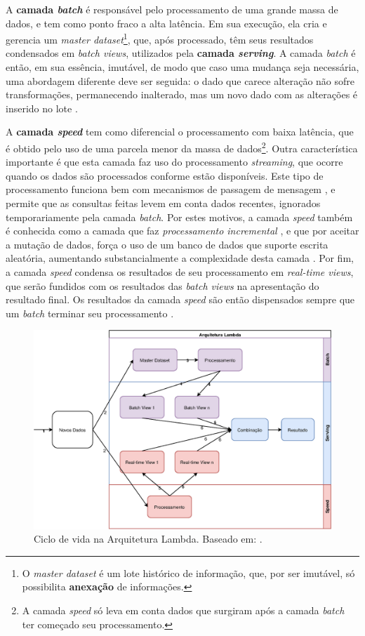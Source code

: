 A \textbf{camada \textit{batch}} é responsável pelo processamento de uma grande
massa de dados, e tem como ponto fraco a alta latência. Em sua execução, ela
cria e gerencia um \textit{master dataset}\footnote{O \textit{master dataset} é um lote
histórico de informação, que, por ser imutável, só possibilita \textbf{anexação}
de informações.}, que, após processado, têm seus resultados condensados em
\textit{batch views}, utilizados pela \textbf{camada \textit{serving}}.
A camada \textit{batch} é então, em sua essência, imutável, de modo que caso
uma mudança seja necessária, uma abordagem diferente deve ser seguida: o dado
que carece alteração não sofre transformações, permanecendo inalterado, mas um
novo dado com as alterações é inserido no lote \cite{marz2015}.

A \textbf{camada \textit{speed}} tem como diferencial o processamento com baixa
latência, que é obtido pelo uso de uma parcela menor da massa de dados\footnote{
A camada \textit{speed} só leva em conta dados que surgiram após a camada
\textit{batch} ter começado seu processamento.}. Outra característica importante
é que esta camada faz uso do processamento \textit{streaming}, que ocorre
quando os dados são processados conforme estão disponíveis. Este tipo de
processamento funciona bem com mecanismos de passagem de mensagem
\cite{marz2015}, e permite que as consultas feitas levem em conta dados
recentes, ignorados temporariamente pela camada \textit{batch}. Por estes
motivos, a camada \textit{speed} também é conhecida como a camada que faz
\textit{processamento incremental} \cite{marz2015}, e que por aceitar a mutação
de dados, força o uso de um banco de dados que suporte escrita aleatória,
aumentando substancialmente a complexidade desta camada \cite{marz2015}. Por
fim, a camada \textit{speed} condensa os resultados de seu processamento em
\textit{real-time views}, que serão fundidos com os resultados das
\textit{batch views} na apresentação do resultado final. Os resultados da
camada \textit{speed} são então dispensados sempre que um \textit{batch}
terminar seu processamento \cite{marz2015}.

\begin{figure}
  \centering
    \includegraphics[width=\textwidth]{figuras/lambda-lifecycle.eps}
    \caption{Ciclo de vida na Arquitetura Lambda. Baseado em: .}
  \label{fig:lambda-lifecycle}
\end{figure}

